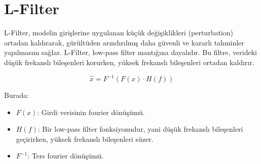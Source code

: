 \section{L-Filter}

L-Filter, modelin girişlerine uygulanan küçük değişiklikleri (perturbation) ortadan kaldırarak, gürültüden arındırılmış daha güvenli ve kararlı tahminler yapılmasını sağlar. L-Filter, low-pass filter mantığına dayalıdır. Bu filtre, verideki düşük frekanslı bileşenleri korurken, yüksek frekanslı bileşenleri ortadan kaldırır.

\[ \hat{x} = F^{-1}(F(x) \cdot H(f)) \]

Burada:

\begin{itemize}
    \item $F(x)$: Girdi verisinin fourier dönüşümü.
    \item $H(f)$: Bir low-pass filter fonksiyonudur, yani düşük frekanslı bileşenleri geçirirken, yüksek frekanslı bileşenleri süzer.
    \item $F^{-1}$: Ters fourier dönüşümü.
\end{itemize}

\newpage
